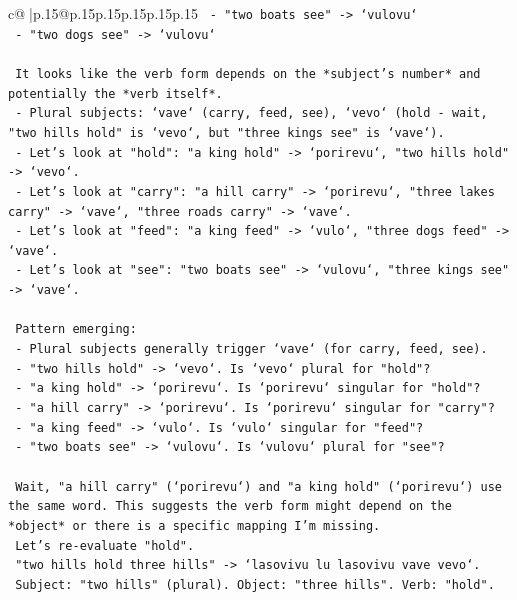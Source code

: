 \documentclass{article}
\begin{document}
{\begin{supertabular}{c@{$\;$}|p{.15\linewidth}@{}p{.15\linewidth}p{.15\linewidth}p{.15\linewidth}p{.15\linewidth}p{.15\linewidth}}
{{{\texttt{   {-} "two boats see" {-}> `vulovu`} \\
\texttt{   {-} "two dogs see" {-}> `vulovu`} \\
\\ 
\texttt{   It looks like the verb form depends on the *subject's number* and potentially the *verb itself*.} \\
\texttt{   {-} Plural subjects: `vave` (carry, feed, see), `vevo` (hold {-} wait, "two hills hold" is `vevo`, but "three kings see" is `vave`).} \\
\texttt{   {-} Let's look at "hold": "a king hold" {-}> `porirevu`, "two hills hold" {-}> `vevo`.} \\
\texttt{   {-} Let's look at "carry": "a hill carry" {-}> `porirevu`, "three lakes carry" {-}> `vave`, "three roads carry" {-}> `vave`.} \\
\texttt{   {-} Let's look at "feed": "a king feed" {-}> `vulo`, "three dogs feed" {-}> `vave`.} \\
\texttt{   {-} Let's look at "see": "two boats see" {-}> `vulovu`, "three kings see" {-}> `vave`.} \\
\\ 
\texttt{   Pattern emerging:} \\
\texttt{   {-} Plural subjects generally trigger `vave` (for carry, feed, see).} \\
\texttt{   {-} "two hills hold" {-}> `vevo`. Is `vevo` plural for "hold"?} \\
\texttt{   {-} "a king hold" {-}> `porirevu`. Is `porirevu` singular for "hold"?} \\
\texttt{   {-} "a hill carry" {-}> `porirevu`. Is `porirevu` singular for "carry"?} \\
\texttt{   {-} "a king feed" {-}> `vulo`. Is `vulo` singular for "feed"?} \\
\texttt{   {-} "two boats see" {-}> `vulovu`. Is `vulovu` plural for "see"?} \\
\\ 
\texttt{   Wait, "a hill carry" (`porirevu`) and "a king hold" (`porirevu`) use the same word. This suggests the verb form might depend on the *object* or there is a specific mapping I'm missing.} \\
\texttt{   Let's re{-}evaluate "hold".} \\
\texttt{   "two hills hold three hills" {-}> `lasovivu lu lasovivu vave vevo`.} \\
\texttt{   Subject: "two hills" (plural). Object: "three hills". Verb: "hold".} \\
}}}
\end{supertabular}}
\end{document}
